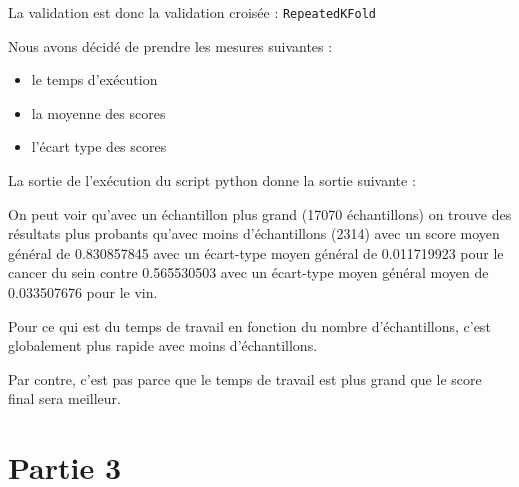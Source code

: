\documentclass[a4paper,10pt]{article}
\begin{document}
    La validation est donc la validation croisée : \verb?RepeatedKFold?
    
    Nous avons décidé de prendre les mesures suivantes :
    \begin{itemize}
        \item le temps d'exécution
        \item la moyenne des scores
        \item l'écart type des scores
    \end{itemize}
    
    La sortie de l'exécution du script python donne la sortie suivante : 
    
    
    
    On peut voir qu'avec un échantillon plus grand (17070 échantillons) on trouve des résultats plus probants qu'avec moins d'échantillons (2314) avec un score moyen général de 0.830857845 avec un écart-type moyen général de 0.011719923 pour le cancer du sein contre 0.565530503 avec un écart-type moyen général moyen de 0.033507676 pour le vin.
    
    Pour ce qui est du temps de travail en fonction du nombre d'échantillons, c'est globalement plus rapide avec moins d'échantillons.
    
    Par contre, c'est pas parce que le temps de travail est plus grand que le score final sera meilleur.
\section{Partie 3}
\end{document}
